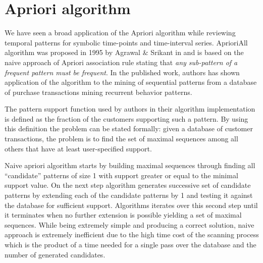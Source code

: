 \section{Apriori algorithm}
We have seen a broad application of the Apriori algorithm while reviewing temporal patterns for symbolic time-points and time-interval series. AprioriAll algorithm was proposed in 1995 by Agrawal \& Srikant in \cite{citeulike:775528} and is based on the naive approach of Apriori association rule stating that \textit{any sub-pattern of a frequent pattern must be frequent}. In the published work, authors has shown application of the algorithm to the mining of sequential patterns from a database of purchase transactions mining recurrent behavior patterns. 

The pattern support function used by authors in their algorithm implementation is defined as the fraction of the customers supporting such a pattern. By using this definition the problem can be stated formally: given a database of customer transactions, the problem is to find the set of maximal sequences among all others that have at least user-specified support.

Naive apriori algorithm starts by building maximal sequences through finding all ``candidate'' patterns of size 1 with support greater or equal to the minimal support value. On the next step algorithm generates successive set of candidate patterns by extending each of the candidate patterns by 1 and testing it against the database for sufficient support. Algorithms iterates over this second step until it terminates when no further extension is possible yielding a set of maximal sequences. While being extremely simple and producing a correct solution, naive approach is extremely inefficient due to the high time cost of the scanning process which is the product of a time needed for a single pass over the database and the number of generated candidates.

